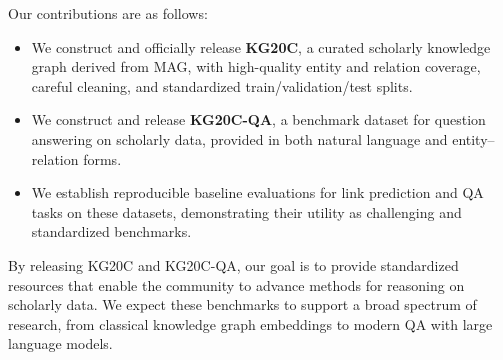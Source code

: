 \documentclass[conference]{IEEEtran}
\begin{document}
Our contributions are as follows:
\begin{itemize}
	\item We construct and officially release \textbf{KG20C}, a curated scholarly knowledge graph derived from MAG, with high-quality entity and relation coverage, careful cleaning, and standardized train/validation/test splits.
	\item We construct and release \textbf{KG20C-QA}, a benchmark dataset for question answering on scholarly data, provided in both natural language and entity--relation forms.
	\item We establish reproducible baseline evaluations for link prediction and QA tasks on these datasets, demonstrating their utility as challenging and standardized benchmarks.
\end{itemize}

By releasing KG20C and KG20C-QA, our goal is to provide standardized resources that enable the community to advance methods for reasoning on scholarly data. We expect these benchmarks to support a broad spectrum of research, from classical knowledge graph embeddings to modern QA with large language models.
\end{document}
